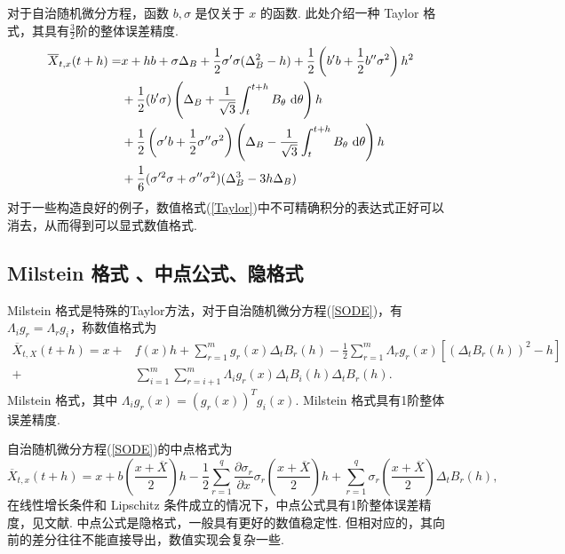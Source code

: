 对于自治随机微分方程，函数 $b,\sigma$ 是仅关于 $x$ 的函数. 此处介绍一种 Taylor 格式，其具有$\frac32$阶的整体误差精度.
\begin{equation}\label{Taylor}
\begin{aligned}
\overline{X}_{t,x} (t+h)=& x+h b + \sigma \Delta_B +\frac12 \sigma'\sigma (\Delta_B^2-h) + \frac12 \left( b'b + \frac 12 b''\sigma^2 \right) h^2\\
&+\frac{1}{2}(b'\sigma)
\left(\Delta _B +\frac{1}{\sqrt{3}} \int _t^{t+h} B_\theta \text{ d} \theta\right) h\\
&+\frac{1}{2}\left( \sigma'b+\frac12 \sigma ''\sigma^2 \right)
\left(\Delta _B - \frac{1}{\sqrt{3}} \int _t^{t+h} B_\theta \text{ d} \theta\right) h\\
&+\frac16 (\sigma'^2 \sigma + \sigma''\sigma^2) (\Delta_B^3-3h\Delta _B)
\end{aligned}
\end{equation}
对于一些构造良好的例子，数值格式(\ref{Taylor})中不可精确积分的表达式正好可以消去，从而得到可以显式数值格式. 




\subsection{Milstein 格式 、中点公式、隐格式}
Milstein 格式是特殊的Taylor方法，对于自治随机微分方程(\ref{SODE})，有 $\Lambda_ig_r = \Lambda_rg_i$，称数值格式为
\[
\begin{aligned} 
	\overline{X}_{t,X}(t+h) = x+&f(x)h + \sum_{r=1}^m g_r(x) \Delta_t B_r(h) - \frac12\sum_{r=1}^m \Lambda_rg_r(x)[ (\Delta_t B_r(h))^2-h] \\
	+&\sum_{i=1}^m \sum_{r=i+1}^m\Lambda_ig_r(x) \Delta_t B_i(h) \Delta_t B_r(h).
\end{aligned} 
\]
Milstein 格式，其中 $\Lambda_ig_r(x) = (g_r(x))^Tg_i(x)$. Milstein 格式具有1阶整体误差精度. 

自治随机微分方程(\ref{SODE})的中点格式为
\begin{equation}\label{mid_point}
\overline{X}_{t,x}(t+h) = x + b\left( \frac{x+\overline{X}}{2}\right) h  - \frac12 \sum^q_{r=1} \frac{\partial \sigma_r}{\partial x} \sigma_r \left( \frac{x+\overline{X}}{2}\right) h  + \sum^q_{r=1} \sigma_r \left(\frac{x+\overline X}{2} \right)  \Delta_t B_r(h),
\end{equation}
在线性增长条件和 Lipschitz 条件成立的情况下，中点公式具有1阶整体误差精度，见文献\cite{kutta_1,kutta_2}. 中点公式是隐格式，一般具有更好的数值稳定性. 但相对应的，其向前的差分往往不能直接导出，数值实现会复杂一些. 

